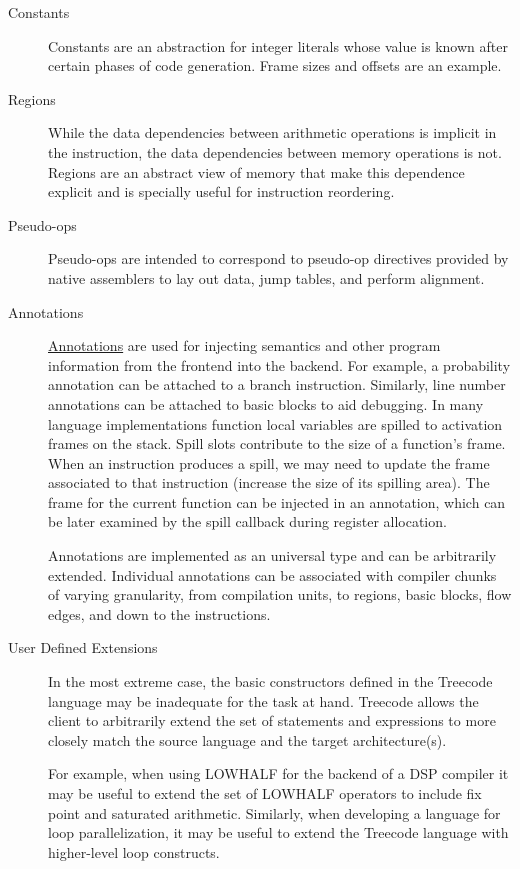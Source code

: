   \begin{description} 
    \item[Constants] Constants are an
    abstraction for integer literals whose value is known after
    certain phases of code generation. Frame sizes and offsets are an
    example.  
    \item[Regions] While the data
    dependencies between arithmetic operations is implicit in the
    instruction, the data dependencies between memory operations is
    not. Regions are an abstract view of memory that make this
    dependence explicit and is specially useful for instruction
    reordering. 

    \item[Pseudo-ops] Pseudo-ops are
    intended to correspond to pseudo-op directives provided by native
    assemblers to lay out data, jump tables, and perform alignment.

    \item[Annotations]
    \href{annotations.html}{Annotations} are used
    for injecting semantics and other program information from the frontend 
    into the backend.  For example, a probability annotation can be
    attached to a branch instruction.  Similarly, line number annotations
    can be attached to basic blocks to aid debugging.   
    In many language implementations function local variables are
    spilled to activation frames on the stack. Spill slots contribute
    to the size of a function's frame. When an instruction produces a
    spill, we may need to update the frame associated to that
    instruction (increase the size of its spilling area). The frame
    for the current function can be injected in an annotation, which
    can be later examined by the spill callback during register allocation. 

     Annotations are
    implemented as an universal type and can be arbitrarily extended.
    Individual annotations can be associated
    with compiler chunks of varying granularity, 
    from compilation units, to regions, basic blocks, flow edges,
    and down to the instructions.


    \item[User Defined Extensions]
    In the most extreme case, the basic constructors defined in the Treecode
    language may be inadequate for the task at hand.  
    Treecode allows the client to arbitrarily extend
    the set of statements and expressions to more closely match the
    source language and the target architecture(s). 
    
     For example, when using LOWHALF for the backend of a DSP compiler 
     it may be useful to extend the set of LOWHALF operators to include 
     fix point and saturated arithmetic.  
     Similarly, when developing a language for loop parallelization, it may
     be useful to extend the Treecode language with higher-level loop 
     constructs.
  \end{description} 

